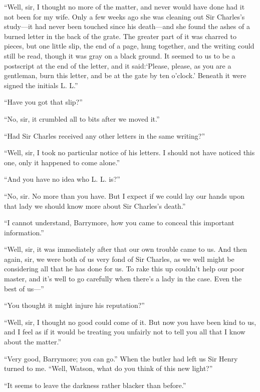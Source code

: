 \documentclass[paper=a5,BCOR=7mm,twoside,DIV=calc,12pt,usegeometry,openany,chapterprefix,endperiod,headings=big]{scrbook} %
\begin{document}
\enquote{Well, sir, I thought no more of the matter, and never would have done had it not been for my wife. Only a few weeks ago she was cleaning out Sir Charles's study---it had never been touched since his death---and she found the ashes of a burned letter in the back of the grate. The greater part of it was charred to pieces, but one little slip, the end of a page, hung together, and the writing could still be read, though it was gray on a black ground. It seemed to us to be a postscript at the end of the letter, and it said:\enquote{Please, please, as you are a gentleman, burn this letter, and be at the gate by ten o'clock.} Beneath it were signed the initials L. L.}

\enquote{Have you got that slip?}

\enquote{No, sir, it crumbled all to bits after we moved it.}

\enquote{Had Sir Charles received any other letters in the same writing?}

\enquote{Well, sir, I took no particular notice of his letters. I should not have noticed this one, only it happened to come alone.}

\enquote{And you have no idea who L. L. is?}

\enquote{No, sir. No more than you have. But I expect if we could lay our hands upon that lady we should know more about Sir Charles's death.}

\enquote{I cannot understand, Barrymore, how you came to conceal this important information.}

\enquote{Well, sir, it was immediately after that our own trouble came to us. And then again, sir, we were both of us very fond of Sir Charles, as we well might be considering all that he has done for us. To rake this up couldn't help our poor master, and it's well to go carefully when there's a lady in the case. Even the best of us---}

\enquote{You thought it might injure his reputation?}

\enquote{Well, sir, I thought no good could come of it. But now you have been kind to us, and I feel as if it would be treating you unfairly not to tell you all that I know about the matter.}

\enquote{Very good, Barrymore; you can go.} When the butler had left us Sir Henry turned to me. \enquote{Well, Watson, what do you think of this new light?}

\enquote{It seems to leave the darkness rather blacker than before.}
\end{document}
